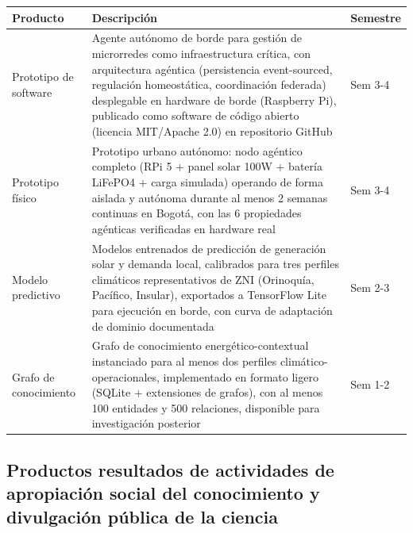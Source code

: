 \documentclass[12pt,letterpaper]{article}
\begin{document}
\begin{longtable}{>{\raggedright\arraybackslash}p{3.5cm} >{\raggedright\arraybackslash}p{9cm} >{\centering\arraybackslash}p{2cm}}
\toprule
\textbf{Producto} & \textbf{Descripci\'on} & \textbf{Semestre} \\
\midrule
\endhead
Prototipo de software & Agente aut\'onomo de borde para gesti\'on de microrredes como infraestructura cr\'itica, con arquitectura ag\'entica (persistencia event-sourced, regulaci\'on homeost\'atica, coordinaci\'on federada) desplegable en hardware de borde (Raspberry Pi), publicado como software de c\'odigo abierto (licencia MIT/Apache 2.0) en repositorio GitHub & Sem 3-4 \\
\midrule
Prototipo f\'isico & Prototipo urbano aut\'onomo: nodo ag\'entico completo (RPi 5 + panel solar 100W + bater\'ia LiFePO4 + carga simulada) operando de forma aislada y aut\'onoma durante al menos 2 semanas continuas en Bogot\'a, con las 6 propiedades ag\'enticas verificadas en hardware real & Sem 3-4 \\
\midrule
Modelo predictivo & Modelos entrenados de predicci\'on de generaci\'on solar y demanda local, calibrados para tres perfiles clim\'aticos representativos de ZNI (Orinoqu\'ia, Pac\'ifico, Insular), exportados a TensorFlow Lite para ejecuci\'on en borde, con curva de adaptaci\'on de dominio documentada & Sem 2-3 \\
\midrule
Grafo de conocimiento & Grafo de conocimiento energ\'etico-contextual instanciado para al menos dos perfiles clim\'atico-operacionales, implementado en formato ligero (SQLite + extensiones de grafos), con al menos 100 entidades y 500 relaciones, disponible para investigaci\'on posterior & Sem 1-2 \\
\bottomrule
\end{longtable}

\subsection{Productos resultados de actividades de apropiaci\'on social del conocimiento y divulgaci\'on p\'ublica de la ciencia}
\end{document}

